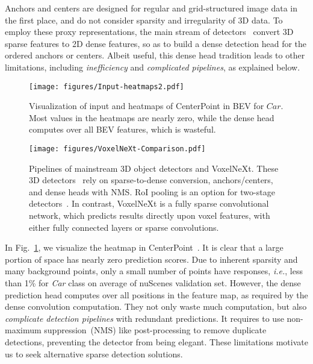 \documentclass[10pt,twocolumn,letterpaper]{article}
\begin{document}
Anchors and centers are designed for regular and grid-structured image data in the first place, and do not consider sparsity and irregularity of 3D data. To employ these proxy representations, the main stream of detectors~\cite{centerpoint, pvrcnn, voxel-rcnn} convert 3D sparse features to 2D dense features, so as to build a dense detection head for the ordered anchors or centers. Albeit useful, this dense head tradition leads to other limitations, including {\em inefficiency} and {\em complicated pipelines}, as explained below.
\begin{figure}[t]
\begin{center}
   \texttt{[image: figures/Input-heatmaps2.pdf]}
   \caption{Visualization of input and heatmaps of CenterPoint in BEV for $Car$. Most values in the heatmaps are nearly zero, while the dense head computes over all BEV features, which is wasteful.}
   \label{fig:centerpoint-bev}
\end{center}
\end{figure}

\begin{figure*}[t]
\begin{center}
   \texttt{[image: figures/VoxelNeXt-Comparison.pdf]}
   \caption{Pipelines of mainstream 3D object detectors and VoxelNeXt. These 3D detectors~\cite{centerpoint,pvrcnn,voxel-rcnn} rely on sparse-to-dense conversion, anchors/centers, and dense heads with NMS. RoI pooling is an option for two-stage detectors~\cite{voxel-rcnn,pvrcnn}. In contrast, VoxelNeXt is a fully sparse convolutional network, which predicts results directly upon voxel features, with either fully connected layers or sparse convolutions.}
   \label{fig:framework-comparison}
\end{center}
\end{figure*}

In Fig.~\ref{fig:centerpoint-bev}, we visualize the heatmap in CenterPoint~\cite{centerpoint}. It is clear that a large portion of space has nearly zero prediction scores. Due to inherent sparsity and many background points, only a small number of points have responses, {\em i.e.}, less than 1\% for {\em Car} class on average of nuScenes validation set. However, the dense prediction head computes over all positions in the feature map, as required by the dense convolution computation. They not only waste much computation, but also {\em complicate detection pipelines} with redundant predictions. It requires to use non-maximum suppression~(NMS) like post-processing to remove duplicate detections, preventing the detector from being elegant. These limitations motivate us to seek alternative sparse detection solutions.
\end{document}
